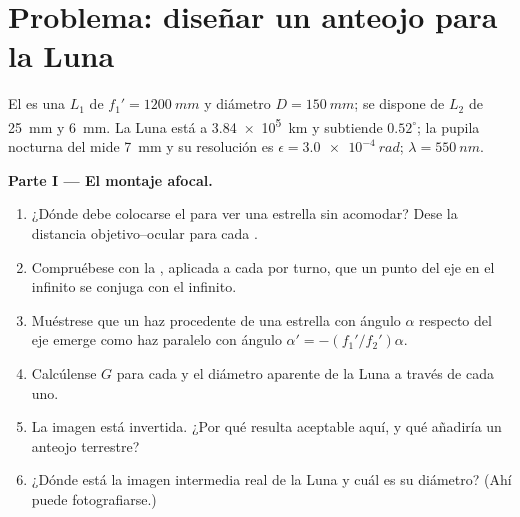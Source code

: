 \section{Problema: diseñar un anteojo para la Luna}

\begin{problem}
\label{pb:b1:optical-instruments:1}
El  es una  $L_1$ de 
$f_1' = \qty{1200}{mm}$ y diámetro $D = \qty{150}{mm}$; se dispone de
 $L_2$ de  \qty{25}{mm} y \qty{6}{mm}. La Luna
está a \qty{3.84e5}{km} y subtiende $0.52^\circ$; la pupila nocturna del
 mide \qty{7}{mm} y su resolución es $\epsilon = \qty{3.0e-4}{rad}$;
$\lambda = \qty{550}{nm}$.

\medskip
\noindent\textbf{Parte I --- El montaje afocal.}
\begin{enumerate}
  \item ¿Dónde debe colocarse el  para ver una estrella sin
        acomodar? Dese la distancia objetivo--ocular para cada .
  \item Compruébese con la , aplicada a cada 
        por turno, que un punto del eje en el infinito se conjuga con el
        infinito.
  \item Muéstrese que un haz procedente de una estrella con ángulo
        $\alpha$ respecto del eje emerge como haz paralelo con ángulo
        $\alpha' = -(f_1'/f_2')\alpha$.
  \item Calcúlense $G$ para cada  y el diámetro aparente de la Luna
        a través de cada uno.
  \item La imagen está invertida. ¿Por qué resulta aceptable aquí, y qué
        añadiría un anteojo terrestre?
  \item ¿Dónde está la imagen intermedia real de la Luna y cuál es su
        diámetro? (Ahí puede fotografiarse.)
\end{enumerate}


\end{problem}
